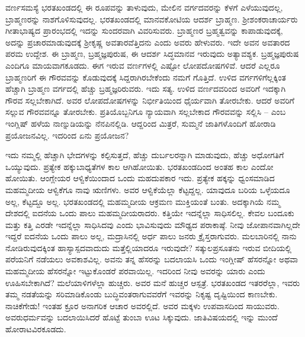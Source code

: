 ವರ್ಣಸಮಸ್ಯೆ ಭರತಖಂಡದಲ್ಲಿ ಈ ರೂಪವನ್ನು ತಾಳುವುದು, ಮೇಲಿನ ವರ್ಗದವರನ್ನು ಕೆಳಗೆ ಎಳೆಯುವುದಲ್ಲ, ಬ್ರಾಹ್ಮಣರನ್ನು ನಾಶಗೊಳಿಸುವುದಲ್ಲ. ಭರತಖಂಡದಲ್ಲಿ ಮಾನವಕೋಟಿಯ ಆದರ್ಶ ಬ್ರಾಹ್ಮಣ. ಶ‍್ರೀಶಂಕರಾಚಾರ್ಯರು ಗೀತಾಭಾಷ್ಯದ ಪ್ರಾರಂಭದಲ್ಲಿ ಇದನ್ನು ಸುಂದರವಾಗಿ ವಿವರಿಸುವರು. ಬ್ರಾಹ್ಮಣರ ಬ್ರಹ್ಮತ್ವವನ್ನು ಕಾಪಾಡುವುದಕ್ಕೆ, ಅದನ್ನು ಪ್ರಚಾರಮಾಡುವುದಕ್ಕೆ ಶ‍್ರೀಕೃಷ್ಣ ಅವತಾರವೆತ್ತಿದನು ಎಂದು ಅವರು ಹೇಳುವರು. ಇದೇ ಅವನ ಅವತಾರದ ಪರಮ ಉದ್ದೇಶ. ಈ ಬ್ರಾಹ್ಮಣ, ಬ್ರಹ್ಮಜ್ಞಪುರುಷ, ಈ ಆದರ್ಶ ಸಿದ್ಧಮಾನವ ಇರುವುದು ಅತ್ಯಾವಶ್ಯಕ. ಬ್ರಹ್ಮಜ್ಞಪುರುಷ ಎಂದಿಗೂ ಮಾಯವಾಗಕೂಡದು. ಈಗ ಇರುವ ವರ್ಣಗಳಲ್ಲಿ ಎಷ್ಟೋ ಲೋಪದೋಷಗಳಿವೆ. ಆದರೆ ಎಲ್ಲರೂ ಬ್ರಾಹ್ಮಣರಿಗೆ ಈ ಗೌರವವನ್ನು ಕೊಡುವುದಕ್ಕೆ ಸಿದ್ದರಾಗಿರಬೇಕೆಂದು ನಮಗೆ ಗೊತ್ತಿದೆ. ಉಳಿದ ವರ್ಗಗಳಿಗೆಲ್ಲಕ್ಕಿಂತ ಹೆಚ್ಚಾಗಿ ಬ್ರಾಹ್ಮಣ ವರ್ಗದಲ್ಲಿ ಹೆಚ್ಚು ಬ್ರಹ್ಮಜ್ಞರಿರುವರು. ಇದು ಸತ್ಯ. ಉಳಿದ ವರ್ಣದವರಿಂದ ಅವರಿಗೆ ಇದಕ್ಕಾಗಿ ಗೌರವ ಸಲ್ಲಬೇಕಾಗಿದೆ. ಅವರ ಲೋಪದೋಷಗಳನ್ನು ನಿರ್ಭೀತಿಯಿಂದ ಧೈರ್ಯವಾಗಿ ತೋರಬೇಕು. ಆದರೆ ಅವರಿಗೆ ಸಲ್ಲುವ ಗೌರವವನ್ನೂ ತೋರಬೇಕು.  ಪ್ರತಿಯೊಬ್ಬನಿಗೂ ನ್ಯಾಯವಾಗಿ ಸಲ್ಲಬೇಕಾದ ಗೌರವವನ್ನು ಸಲ್ಲಿಸಿ – ಎಂಬ ಇಂಗ್ಲಿಷ್​ ಹಳೆಯ ನಾಣ್ನುಡಿಯನ್ನು ನೆನಪಿನಲ್ಲಿಡಿ. ಆದ್ದರಿಂದ ಮಿತ್ರರೆ, ಸುಮ್ಮನೆ ಜಾತಿಗಳೊಂದಿಗೆ ಹೋರಾಡಿ ಪ್ರಯೋಜನವಿಲ್ಲ. ಇದರಿಂದ ಏನು ಪ್ರಯೋಜನ?

ಇದು ನಮ್ಮಲ್ಲಿ ಹೆಚ್ಚಾಗಿ ಭೇದಗಳನ್ನು ಕಲ್ಪಿಸುತ್ತದೆ, ಹೆಚ್ಚು ದುರ್ಬಲರನ್ನಾಗಿ ಮಾಡುವುದು, ಹೆಚ್ಚು ಅಧೋಗತಿಗೆ ಒಯ್ಯುವುದು. ಪ್ರತ್ಯೇಕ ಹಕ್ಕುಬಾಧ್ಯತೆಗಳ ಕಾಲ ಆಗಿಹೋಯಿತು. ಭರತಖಂಡದಿಂದ ಅಂತಹ ಕಾಲ ಎಂದೋ ಹೋಯಿತು. ಆಂಗ್ಲೇಯರ ಆಳ್ವಿಕೆಯಿಂದಾದ ಒಂದು ಮಹದುಪಕಾರ ಇದು. ಪ್ರತ್ಯೇಕ ಹಕ್ಕನ್ನು ಧ್ವಂಸಮಾಡಿದ ಮಹಮ್ಮದೀಯ ಆಳ್ವಿಕೆಗೂ ನಾವು ಋಣಿಗಳು. ಅವರ ಆಳ್ವಿಕೆಯೆಲ್ಲಾ ಕೆಟ್ಟದ್ದಲ್ಲ. ಯಾವುದೂ ಬರಿಯ ಒಳ್ಳೆಯದೂ ಅಲ್ಲ, ಕೆಟ್ಟದ್ದೂ ಅಲ್ಲ. ಭರತಖಂಡದಲ್ಲಿ ಮಹಮ್ಮದೀಯ ಆಕ್ರಮಣ ಮುಕ್ತಿಯಂತೆ ಬಂತು. ಅದಕ್ಕಾಗಿಯೆ ನಮ್ಮ ದೇಶದಲ್ಲಿ ಐದನೆಯ ಒಂದು ಪಾಲು ಮಹಮ್ಮದೀಯರಾದರು. ಕತ್ತಿಯೇ ಇದನ್ನೆಲ್ಲಾ ಸಾಧಿಸಲಿಲ್ಲ. ಕೇವಲ ಬಂದೂಕು ಮತ್ತು ಕತ್ತಿ ಎರಡೇ ಇದನ್ನೆಲ್ಲಾ ಸಾಧಿಸಿದವು ಎಂದು ಭಾವಿಸುವುದು ಮೌಢ್ಯದ ಪರಾಕಾಷ್ಠೆ. ನೀವು ಜೋಪಾನವಾಗಿಲ್ಲದೇ ಇದ್ದರೆ ಐದನೆಯ ಒಂದು ಪಾಲು ಅಲ್ಲ, ಮದ್ರಾಸಿನಲ್ಲಿ ಅರ್ಧ ಪಾಲು ಜನರು ಕ್ರೈಸ್ತರಾಗುವರು. ಮಲಬಾರಿನಲ್ಲಿ ನಾನು ನೋಡಿರುವುದಕ್ಕಿಂತ ಹಾಸ್ಯಾಸ್ಪದವಾದುದು ಮತ್ತೆಲ್ಲಿಯಾದರೂ ಇರುವುದೇ? ಸತ್ಕುಲಪ್ರಸೂತನು ಇರುವ ಬೀದಿಯಲ್ಲಿ ಪರೆಯನಿಗೆ ನಡೆಯಲು ಅವಕಾಶವಿಲ್ಲ. ಅವನು ತನ್ನ ಹೆಸರನ್ನು ಬದಲಾಯಸಿ ಒಂದು ಇಂಗ್ಲೀಷ್​ ಹೆಸರನ್ನೋ ಅಥವಾ ಮಹಮ್ಮದೀಯ ಹೆಸರನ್ನೋ ಇಟ್ಟುಕೊಂಡರೆ ಪರವಾಯಿಲ್ಲ. ಇದರಿಂದ ನೀವು ಅವರನ್ನು ಯಾರು ಎಂದು ಊಹಿಸಬೇಕಾಗಿದೆ? ಮಲೆಯಾಳಿಗಳೆಲ್ಲಾ ಹುಚ್ಚರು. ಅವರ ಮನೆ ಹುಚ್ಚರ ಆಸ್ಪತ್ರೆ. ಭರತಖಂಡದ ಇತರರೆಲ್ಲಾ, ಇವರು ತಮ್ಮ ನಡತೆಯನ್ನು ಸರಿಮಾಡಿಕೊಂಡು ಬುದ್ಧಿವಂತರಾಗುವವರೆಗೆ ಇವರನ್ನು ನಿಕೃಷ್ಟ ದೃಷ್ಟಿಯಿಂದ ಕಾಣಬೇಕು. ನಾಚಿಕೆಗೇಡು! ಇಂತಹ ಕ್ರೂರ ಅನಾಗರಿಕ ಆಚಾರ ಅವರಲ್ಲಿದೆ. ಅವರ ಮಕ್ಕಳು ಉಪವಾಸದಿಂದ ಸಾಯುವರು. ಅವರುಧರ್ಮವನ್ನು ಬದಲಾಯಿಸಿದರೆ ಹೊಟ್ಟೆ ತುಂಬಾ ಊಟ ಸಿಕ್ಕುವುದು. ಜಾತಿವಿಷಯದಲ್ಲಿ ಇನ್ನು ಮುಂದೆ ಹೋರಾಟವಿರಕೂಡದು. 

